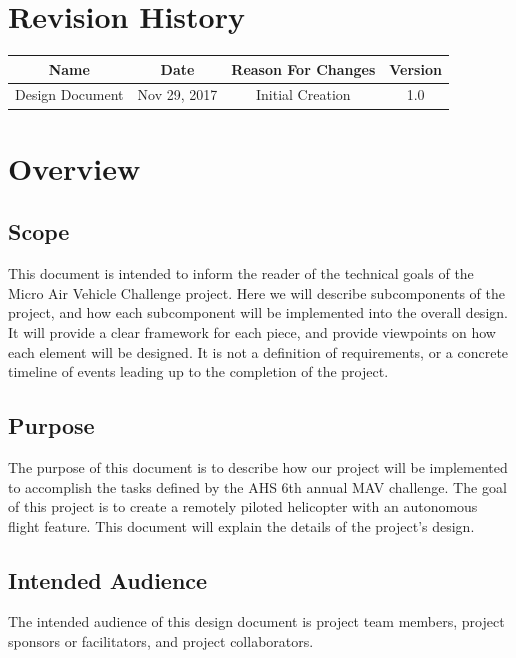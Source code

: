 \documentclass[onecolumn, draftclsnofoot,10pt, compsoc]{IEEEtran}
\begin{document}
\section*{Revision History}

\begin{center}
    \begin{tabular}{|c|c|c|c|}
        \hline
		Name & Date & Reason For Changes & Version\\
        \hline
		Design Document & Nov 29, 2017 & Initial Creation & 1.0\\
		\hline 
    \end{tabular}
\end{center}




\section{Overview}


\subsection{Scope}%

This document is intended to inform the reader of the technical goals of the Micro Air Vehicle Challenge project. Here we will describe subcomponents of the project, and how each subcomponent will be implemented into the overall design. It will provide a clear framework for each piece, and provide viewpoints on how each element will be designed. It is not a definition of requirements, or a concrete timeline of events leading up to the completion of the project.


\subsection{Purpose}%

The purpose of this document is to describe how our project will be implemented to accomplish the tasks defined by the AHS 6th annual MAV challenge. The goal of this project is to create a remotely piloted helicopter with an autonomous flight feature. This document will explain the details of the project's design.


\subsection{Intended Audience}

The intended audience of this design document is project team members, project sponsors or facilitators, and project collaborators.  
\end{document}
